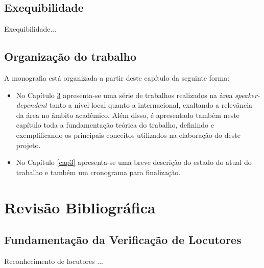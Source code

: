 \documentclass[a4paper,12pt,twoside,openright]{report}
\begin{document}
\section{Exequibilidade}
\par Exequibilidade...

\section{Organiza\c{c}\~{a}o do trabalho}
\par A monografia est\'{a} organizada a partir deste cap\'{i}tulo da seguinte forma:

\begin{itemize}
\item{}No Cap\'{i}tulo \ref{cap2} apresenta-se uma s\'{e}rie de trabalhos realizados na \'{a}rea \textit{speaker-dependent} tanto a n\'{i}vel local quanto a internacional, exaltando a relev\^{a}ncia da \'{a}rea no \^{a}mbito acad\^{e}mico. Al\'{e}m disso, \'{e} apresentado tamb\'{e}m neste cap\'{i}tulo toda a fundamenta{\c c}\~{a}o te\'{o}rica do trabalho, definindo e exemplificando os principais conceitos utilizados na elabora{\c c}\~{a}o do deste projeto.
\end{itemize}

\begin{itemize}
	\item{}No Cap\'{i}tulo \ref{cap3} apresenta-se uma breve descri{\c c}\~{a}o do estado do atual do trabalho e tamb\'{e}m um cronograma para finaliza{\c c}\~{a}o.
\end{itemize}
\chapter{Revis\~{a}o Bibliogr\'{a}fica}
\label{cap2}
\thispagestyle{myheadings}
\section{Fundamenta\c{c}\~{a}o da Verifica\c{c}\~{a}o de Locutores}
\label{secao_reconhecimento}
\par Reconhecimento de locutores \cite{BEIGI2011}...
\end{document}
